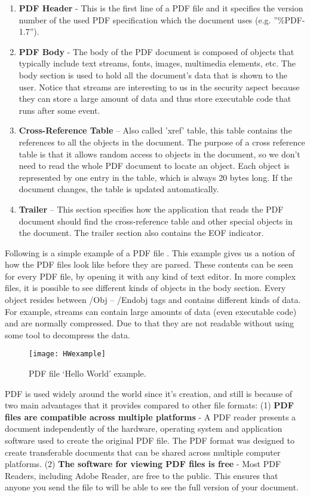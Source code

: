 \documentclass{article}
\begin{document}
\begin{enumerate}
	\item \textbf{PDF Header} - This is the first line of a PDF file and it specifies the version number of the used PDF specification which the document uses (e.g. ”\%PDF-1.7”).
	\item \textbf{PDF Body} - The body of the PDF document is composed of objects that typically include text streams, fonts, images, multimedia elements, etc. The body section is used to hold all the document's data that is shown to the user.
Notice that streams are interesting to us in the security aspect because they can store a large amount of data and thus store executable code that runs after some event.
    \newpage
	\item \textbf{Cross-Reference Table} – Also called 'xref' table, this table contains the references to all the objects in the document. The purpose of a cross reference table is that it allows random access to objects in the document, so we don't need to read the whole PDF document to locate an object. Each object is represented by one entry in the table, which is always 20 bytes long. If the document changes, the table is updated automatically.
	\item \textbf{Trailer} – This section specifies how the application that reads the PDF document should find the cross-reference table and other special objects in the document. The trailer section also contains the EOF indicator.
\end{enumerate}

\indent Following is a simple example of a PDF file \cite{1}. This example gives us a notion of how the PDF files look like before they are parsed. These contents can be seen for every PDF file, by opening it with any kind of text editor. In more complex files, it is possible to see different kinds of objects in the body section. Every object resides between /Obj – /Endobj tags and contains different kinds of data. For example, streams can contain large amounts of data (even executable code) and are normally compressed. Due to that they are not readable without using some tool to decompress the data.

\begin{figure}[h]
    \centering
    \texttt{[image: HWexample]}
    \\
    \caption{PDF file ‘Hello World’ example\cite{1}.}
    \label{fig:HW}
\end{figure}

\indent PDF is used widely around the world since it's creation, and still is because of two main advantages that it provides compared to other file formats: (1) \textbf{PDF files are compatible across multiple platforms} - A PDF reader presents a document independently of the hardware, operating system and application software used to create the original PDF file. The PDF format was designed to create transferable documents that can be shared across multiple computer platforms. (2) \textbf{The software for viewing PDF files is free} - Most PDF Readers, including Adobe Reader, are free to the public.  This ensures that anyone you send the file to will be able to see the full version of your document.
\end{document}
